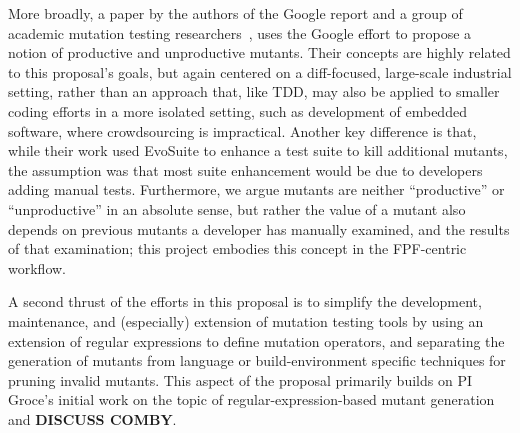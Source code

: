 More broadly, a paper by the
authors of the Google report and a group of academic mutation testing
researchers~\cite{ivankovic2018industrial}, uses the Google effort to
propose a notion of productive and unproductive mutants.  Their
concepts are highly related to this proposal's goals, but again centered on a
diff-focused, large-scale industrial setting, rather than an approach
that, like TDD, may also be applied to smaller coding efforts in a more
isolated setting, such as development of embedded software, where
crowdsourcing is impractical.  Another key difference is that, while their
work used EvoSuite to enhance a test suite to kill additional mutants,
the assumption was that most suite enhancement would be due to
developers adding manual tests.  Furthermore, we argue mutants
are neither ``productive'' or ``unproductive'' in an absolute sense, but
rather the value of a mutant also depends on previous mutants a
developer has manually examined, and the results of that examination;
this project embodies this concept in the FPF-centric workflow.

A second thrust of the efforts in this proposal is to simplify the
development, maintenance, and (especially) extension of mutation
testing tools by using an extension of regular expressions to define
mutation operators, and separating the generation of mutants from
language or build-environment specific techniques for pruning invalid
mutants.  This aspect of the proposal primarily builds on PI Groce's initial work on the topic of
regular-expression-based mutant generation~\cite{regexpMut} and
{\bf DISCUSS COMBY}.  %
